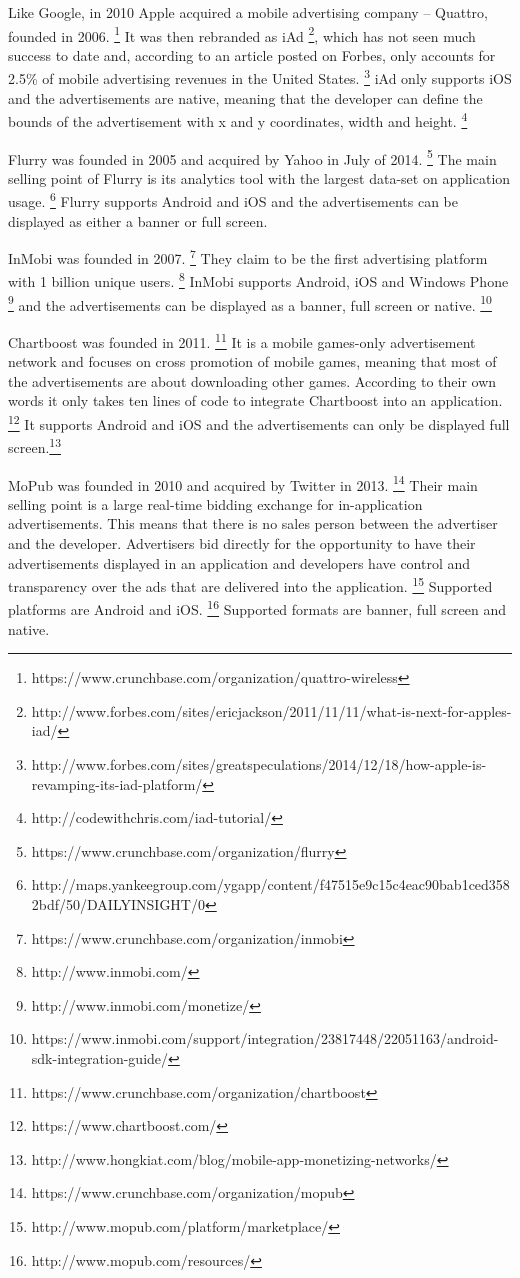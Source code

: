 Like Google, in 2010 Apple acquired a mobile advertising company -- Quattro, founded in 2006. \footnote{https://www.crunchbase.com/organization/quattro-wireless} It was then rebranded as iAd \footnote{http://www.forbes.com/sites/ericjackson/2011/11/11/what-is-next-for-apples-iad/}, which has not seen much success to date and, according to an article posted on Forbes, only accounts for 2.5\% of mobile advertising revenues in the United States. \footnote{http://www.forbes.com/sites/greatspeculations/2014/12/18/how-apple-is-revamping-its-iad-platform/} iAd only supports iOS and the advertisements are native, meaning that the developer can define the bounds of the advertisement with x and y coordinates, width and height. \footnote{http://codewithchris.com/iad-tutorial/}

Flurry was founded in 2005 and acquired by Yahoo in July of 2014. \footnote{https://www.crunchbase.com/organization/flurry} The main selling point of Flurry is its analytics tool with the largest data-set on application usage. \footnote{http://maps.yankeegroup.com/ygapp/content/f47515e9c15c4eac90bab1ced3582bdf/50/DAILYINSIGHT/0} Flurry supports Android and iOS and the advertisements can be displayed as either a banner or full screen.

InMobi was founded in 2007. \footnote{https://www.crunchbase.com/organization/inmobi} They claim to be the first advertising platform with 1 billion unique users. \footnote{http://www.inmobi.com/} InMobi supports Android, iOS and Windows Phone \footnote{http://www.inmobi.com/monetize/} and the advertisements can be displayed as a banner, full screen or native. \footnote{https://www.inmobi.com/support/integration/23817448/22051163/android-sdk-integration-guide/}

Chartboost was founded in 2011. \footnote{https://www.crunchbase.com/organization/chartboost} It is a mobile games-only advertisement network and focuses on cross promotion of mobile games, meaning that most of the advertisements are about downloading other games. According to their own words it only takes ten lines of code to integrate Chartboost into an application. \footnote{https://www.chartboost.com/} It supports Android and iOS and the advertisements can only be displayed full screen.\footnote{http://www.hongkiat.com/blog/mobile-app-monetizing-networks/}

MoPub was founded in 2010 and acquired by Twitter in 2013. \footnote{https://www.crunchbase.com/organization/mopub} Their main selling point is a large real-time bidding exchange for in-application advertisements. This means that there is no sales person between the advertiser and the developer. Advertisers bid directly for the opportunity to have their advertisements displayed in an application and developers have  control and transparency over the ads that are delivered into the application. \footnote{http://www.mopub.com/platform/marketplace/} Supported platforms are Android and iOS. \footnote{http://www.mopub.com/resources/} Supported formats are banner, full screen and native.

